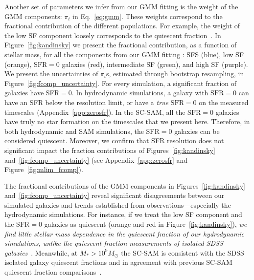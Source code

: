 \documentclass[preprint2,tighten]{aastex62}
\begin{document}
Another set of parameters we infer from our GMM fitting is the weight of the 
GMM components: $\pi_i$ in Eq.~\ref{eq:gmm}. These weights correspond to 
the fractional contribution of the different populations. For example, the 
weight of the low SF component loosely corresponds to the quiescent 
fraction~\citep[\emph{e.g.}][]{borch2006, bundy2006, iovino2010, geha2012, hahn2015}. 
In Figure~\ref{fig:kandinsky} we present the fractional contribution, as a 
function of stellar mass, for all the components from our GMM fitting : SFS 
(blue), low SF (orange), $\mathrm{SFR}{=}0$ galaxies (red), intermediate SF 
(green), and high SF (purple). We present the uncertainties of $\pi_i$s, 
estimated through bootstrap resampling, in Figure~\ref{fig:fcomp_uncertainty}. 
For every simulation, a significant fraction of galaxies have SFR$=0$. 
In hydrodynamic simulations, a galaxy with $\mathrm{SFR}{=}0$ can have an 
SFR below the resolution limit, or have a \emph{true} $\mathrm{SFR}{=}0$ on 
the measured timescales (Appendix~\ref{app:zerosfr}). In the SC-SAM, all 
the $\mathrm{SFR}{=}0$ galaxies have truly no star formation on the 
timescales that we present here. Therefore, in both hydrodynamic 
and SAM simulations, the SFR$=0$ galaxies can be considered quiescent. 
Moreover, we confirm that SFR resolution does not significant impact the 
fraction contributions of Figures~\ref{fig:kandinsky} 
and~\ref{fig:fcomp_uncertainty} (see Appendix~\ref{app:zerosfr} and 
Figure~\ref{fig:mlim_fcomp}).

The fractional contributions of the GMM components in Figures~\ref{fig:kandinsky} 
and~\ref{fig:fcomp_uncertainty} reveal significant disagreements between our 
simulated galaxies and trends established from observations---especially the 
hydrodynamic simulations. For instance, if we treat the low SF component and the 
$\mathrm{SFR}{=}0$ galaxies as quiescent (orange and red in Figure~\ref{fig:kandinsky}),
\emph{we find little stellar mass dependence in the quiescent fraction of our
hydrodynamic simulations, unlike the quiescent fraction measurements 
of isolated SDSS galaxies}~\citep{baldry2006,peng2010,hahn2015}. 
Meanwhile, at $M_* > 10^9M_\odot$ the SC-SAM is consistent with the 
SDSS isolated galaxy quiescent fractions and in agreement with previous 
SC-SAM quiescent fraction comparisons~\citep{brennan2015,brennan2017,pandya2017}.
\end{document}
